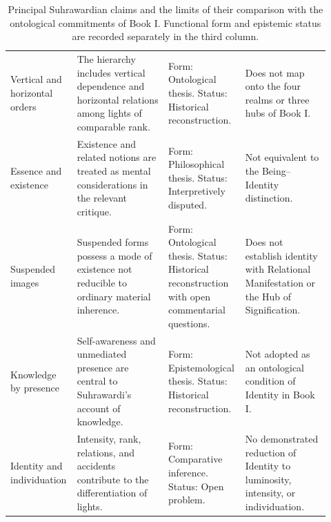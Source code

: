 \begin{table}[htbp]
\begin{tabular}{
    p{0.15\linewidth}
    p{0.29\linewidth}
    p{0.22\linewidth}
    p{0.26\linewidth}
}
Vertical and horizontal orders
&
The hierarchy includes vertical dependence and
horizontal relations among lights of comparable rank.
&
Form: Ontological thesis.
Status: Historical reconstruction.
&
Does not map onto the four realms or three hubs
of Book I.
\\

Essence and existence
&
Existence and related notions are treated as
mental considerations in the relevant critique.
&
Form: Philosophical thesis.
Status: Interpretively disputed.
&
Not equivalent to the Being--Identity distinction.
\\

Suspended images
&
Suspended forms possess a mode of existence not
reducible to ordinary material inherence.
&
Form: Ontological thesis.
Status: Historical reconstruction with open
commentarial questions.
&
Does not establish identity with Relational
Manifestation or the Hub of Signification.
\\

Knowledge by presence
&
Self-awareness and unmediated presence are central
to Suhrawardi's account of knowledge.
&
Form: Epistemological thesis.
Status: Historical reconstruction.
&
Not adopted as an ontological condition of
Identity in Book I.
\\

Identity and individuation
&
Intensity, rank, relations, and accidents contribute
to the differentiation of lights.
&
Form: Comparative inference.
Status: Open problem.
&
No demonstrated reduction of Identity to
luminosity, intensity, or individuation.
\\

\bottomrule
\end{tabular}

\caption{Principal Suhrawardian claims and the limits of their
comparison with the ontological commitments of Book I.
Functional form and epistemic status are recorded separately
in the third column.}
\label{tab:ch08-s14-suhrawardi-claims}

\end{table}

